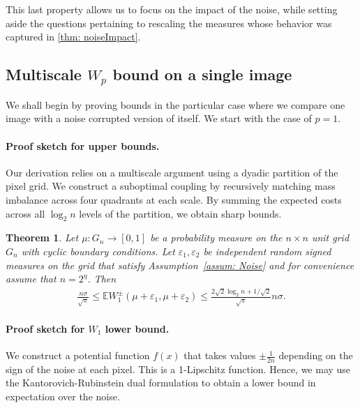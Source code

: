 \documentclass{article}
\theoremstyle{plain}
\newtheorem{thm}{Theorem}[section]
\theoremstyle{definition}
\theoremstyle{remark}
\begin{document}
This last property allows us to focus on the impact of the noise, while setting aside the questions pertaining to rescaling the measures whose behavior was captured in \cref{thm: noiseImpact}.


\subsection{\texorpdfstring{Multiscale $W_p$}{Wp} bound on a single image}\label{subsec: Multiscale Wp on a single image}


We shall begin by proving bounds in the particular case where we compare one image with a noise corrupted version of itself. We start with the case of $p=1$. 

\paragraph{Proof sketch for upper bounds.} Our derivation relies on a multiscale argument using a dyadic partition of the pixel grid. We construct a suboptimal coupling by recursively matching mass imbalance across four quadrants at each scale. By summing the expected costs across all $\log_2 n$ levels of the partition, we obtain sharp bounds.

\begin{thm}\label{thm: W1 between a measure and its noisy counterpart}
Let $\mu : G_n \to [0,1]$ be a probability measure on the $n\times n$ unit grid $G_n$ with cyclic boundary conditions. Let $\varepsilon_1, \varepsilon_2$ be independent random signed measures on the grid that satisfy Assumption~\ref{assum: Noise} and for convenience assume that $n=2^\eta$. Then
\begin{align}
    \frac{n \sigma}{\sqrt{ \pi}}
    \le
    \mathbb{E} W^{\pm}_1(\mu+\varepsilon_1,\mu+\varepsilon_2)
    \le
    \frac{2\sqrt{2} \log_2 n + 1/\sqrt{2} }{\sqrt{\pi}}  n \sigma .
\end{align}
\end{thm}

\paragraph{Proof sketch for $W_1$ lower bound.}
We construct a potential function $f(x)$ that takes values $\pm \frac{1}{2n}$ depending on the sign of the noise at each pixel. This is a 1-Lipschitz function. Hence, we may use the Kantorovich-Rubinstein dual formulation to obtain a lower bound in expectation over the noise.
\end{document}
